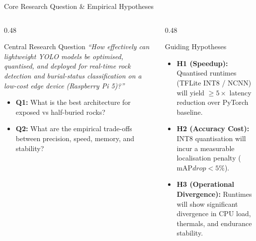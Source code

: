 \documentclass[aspectratio=169,10pt]{beamer}
\begin{document}
\begin{frame}{Core Research Question \& Empirical Hypotheses}
\begin{columns}[T]
  \begin{column}{0.48\textwidth}
    \begin{block}{\small Central Research Question}
      \small
      \textit{``How effectively can lightweight YOLO models be optimised, quantised, and deployed for real-time rock detection and burial-status classification on a low-cost edge device (Raspberry Pi 5)?''}
      \vspace{4pt}
      \begin{itemize}
        \item \textbf{Q1:} What is the best architecture for exposed vs half-buried rocks?
        \item \textbf{Q2:} What are the empirical trade-offs between precision, speed, memory, and stability?
      \end{itemize}
    \end{block}
  \end{column}
  \begin{column}{0.48\textwidth}
    \begin{block}{\small Guiding Hypotheses}
      \small
      \begin{itemize}
        \item \textbf{H1 (Speedup):} Quantised runtimes (TFLite INT8 / NCNN) will yield $\ge 5\times$ latency reduction over PyTorch baseline.
        \item \textbf{H2 (Accuracy Cost):} INT8 quantisation will incur a measurable localisation penalty ($\text{mAP} drop < 5\%$).
        \item \textbf{H3 (Operational Divergence):} Runtimes will show significant divergence in CPU load, thermals, and endurance stability.
      \end{itemize}
    \end{block}
  \end{column}
\end{columns}
\end{frame}

\end{document}
